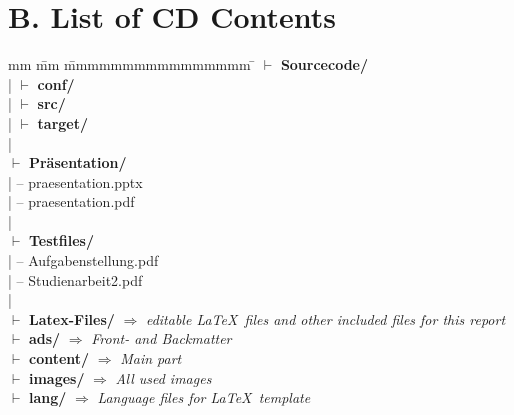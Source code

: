 \section*{B. List of CD Contents}
\begin{tabbing}
	mm \= mm \= mmmmmmmmmmmmmmmm \= \kill
	$\vdash$ \textbf{Sourcecode/} \\ 
	| \> $\vdash$ \textbf{conf/} \> \> \\
	| \> $\vdash$ \textbf{src/} \\
	| \> $\vdash$ \textbf{target/} \\
	| \\
	$\vdash$ \textbf{Präsentation/} \\
	| \>  -- praesentation.pptx \\
	| \>  -- praesentation.pdf \\
	| \\
	$\vdash$ \textbf{Testfiles/} \\ %
	| \>  -- Aufgabenstellung.pdf\\
	| \>  -- Studienarbeit2.pdf\\
	| \\
	$\vdash$ \textbf{Latex-Files/} \> \> \> $\Rightarrow$ \textit{editable \LaTeX~files and other included files for this report}\\ %
	\>  $\vdash$  \textbf{ads/}   	\> \> $\Rightarrow$ \textit{Front- and Backmatter}\\
	\>  $\vdash$  \textbf{content/}  \> \> $\Rightarrow$ \textit{Main part}\\
	\>  $\vdash$  \textbf{images/}   \> \> $\Rightarrow$ \textit{All used images}\\
	\>  $\vdash$  \textbf{lang/}  \> \> $\Rightarrow$ \textit{Language files for \LaTeX~template}\\ %
\end{tabbing}

